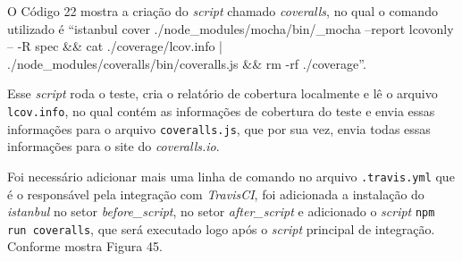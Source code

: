 \par O Código 22 mostra a criação do \textit{script} chamado \textit{coveralls}, no qual o comando utilizado é “istanbul cover ./node\_modules/mocha/bin/\_mocha --report lcovonly -- -R spec \&\& cat ./coverage/lcov.info |   ./node\_modules/coveralls/bin/coveralls.js && rm -rf ./coverage”.


\par Esse \textit{script} roda o teste, cria o relatório de cobertura localmente e lê o arquivo \texttt{lcov.info}, no qual contém as informações de cobertura do teste e envia essas informações para o arquivo \texttt{coveralls.js}, que por sua vez, envia todas essas informações para o site do \textit{coveralls.io}.

\par Foi necessário adicionar mais uma linha de comando no arquivo \texttt{.travis.yml} que é o responsável pela integração com \textit{TravisCI}, foi adicionada a instalação do \textit{istanbul} no setor  \textit{before\_script}, no setor \textit{after\_script} e adicionado o \textit{script}  \texttt{npm run coveralls}, que será executado logo após o \textit{script} principal de integração. Conforme mostra Figura 45.

